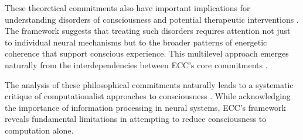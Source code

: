 These theoretical commitments also have important implications for understanding disorders of consciousness and potential therapeutic interventions \cite{thompson2007mind}. The framework suggests that treating such disorders requires attention not just to individual neural mechanisms but to the broader patterns of energetic coherence that support conscious experience. This multilevel approach emerges naturally from the interdependencies between ECC's core commitments \cite{dennett2017from}.

The analysis of these philosophical commitments naturally leads to a systematic critique of computationalist approaches to consciousness \cite{di2017sensorimotor}. While acknowledging the importance of information processing in neural systems, ECC's framework reveals fundamental limitations in attempting to reduce consciousness to computation alone.